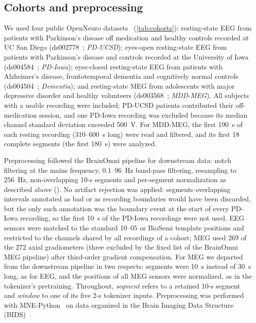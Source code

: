 \documentclass[10pt,letterpaper]{article}
\begin{document}
\subsection*{Cohorts and preprocessing}\label{sec:methods-data}

We used four public OpenNeuro datasets~\cite{markiewicz2021openneuro}
(\cref{tab:cohorts}): resting-state EEG from patients with Parkinson's disease off
medication and healthy controls recorded at UC San Diego
(ds002778~\cite{ds002778,jackson2019waveform,swann2015synchrony,george2013dopaminergic};
\emph{PD-UCSD}); eyes-open resting-state EEG from patients with Parkinson's disease and
controls recorded at the University of Iowa (ds004584~\cite{ds004584,singh2023evoked,anjum2024resting};
\emph{PD-Iowa}); eyes-closed resting-state EEG from patients with Alzheimer's disease,
frontotemporal dementia and cognitively normal controls
(ds004504~\cite{ds004504,miltiadous2023dataset,miltiadous2023dicenet,miltiadous2026ahepa}; \emph{Dementia}); and
resting-state MEG from adolescents with major depressive disorder and healthy
volunteers (ds003568~\cite{ds003568,liuzzi2022meg}; \emph{MDD-MEG}). All subjects
with a usable recording were included; PD-UCSD patients contributed their
off-medication session, and one PD-Iowa recording was excluded because its median
channel standard deviation exceeded 500~\textmu V. For MDD-MEG, the first 190~s of each resting recording (310--600~s
long) were read and filtered, and its first 18 complete segments (the first 180~s) were analyzed.




Preprocessing followed the BrainOmni pipeline for downstream data: notch filtering at the
mains frequency, 0.1--96~Hz band-pass filtering, resampling to 256~Hz, non-overlapping 10-s
segments and per-segment normalization as described above (). No artifact
rejection was applied: segments overlapping intervals annotated as bad or as recording boundaries
would have been discarded, but the only such annotation was the boundary event at the start of every
PD-Iowa recording, so the first 10~s of the PD-Iowa recordings were not used. EEG sensors were matched to the standard 10--05 or BioSemi template positions and
restricted to the channels shared by all recordings of a cohort; MEG used 269 of the 272 axial
gradiometers (three excluded by the fixed list of the BrainOmni MEG pipeline) after third-order
gradient compensation. For MEG we departed from the downstream pipeline in two respects:
segments were 10~s instead of 30~s long, as for EEG, and the positions of all MEG sensors were
normalized, as in the tokenizer's pretraining. Throughout, \emph{segment} refers to a retained 10-s segment and
\emph{window} to one of its five 2-s tokenizer inputs. Preprocessing was performed with
MNE-Python~\cite{gramfort2013mne} on data organized in the Brain Imaging Data Structure (BIDS)~\cite{pernet2019eegbids,niso2018megbids,appelhoff2019mnebids}.
\end{document}
